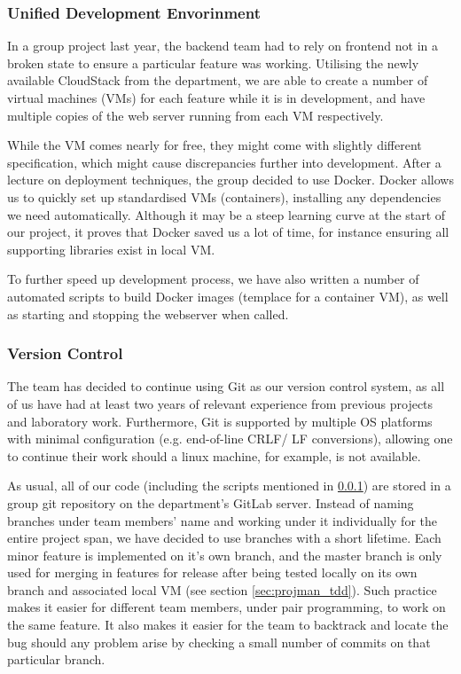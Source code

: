 \documentclass[a4paper, titlepage]{article}
\begin{document}
\subsubsection{Unified Development Envorinment} \label{sec:projman_devenv}


In a group project last year, the backend team had to rely on frontend not in a broken state to ensure a 
particular feature was working. Utilising the newly available CloudStack from the department,
we are able to create a number of virtual machines (VMs) for each feature while it is in development,
and have multiple copies of the web server running from each VM respectively.

While the VM comes nearly for free, they might come with slightly different specification,
which might cause discrepancies further into development. After a lecture on deployment techniques, the group decided to use Docker. Docker allows us to quickly set up standardised VMs (containers), installing any dependencies we need automatically. Although it may be a steep learning curve at the start of our project, it proves that Docker saved us a lot of time, 
for instance ensuring all supporting libraries exist in local VM.

To further speed up development process, we have also written a number of automated scripts
to build Docker images (templace for a container VM), as well as starting and stopping the
webserver when called.

\subsubsection{Version Control}
The team has decided to continue using Git as our version control system, as all of us have had
at least two years of relevant experience from previous projects and laboratory work. Furthermore,
Git is supported by multiple OS platforms with minimal configuration (e.g. end-of-line CRLF/ LF conversions),
allowing one to continue their work should a linux machine, for example, is not available.

As usual, all of our code (including the scripts mentioned in \ref{sec:projman_devenv}) 
are stored in a group git repository on the department's GitLab server. Instead of naming branches under team members'
name and working under it individually for the entire project span, we have decided to use branches with a short lifetime.
Each minor feature is implemented on it's own branch, and the master branch is only used for merging in features for release
after being tested locally on its own branch and associated local VM (see section \ref{sec:projman_tdd}).
Such practice makes it easier for different team members, under pair programming, to work on the same feature.
It also makes it easier for the team to backtrack and locate the bug should any problem arise by checking a small number of commits on that particular branch.
\end{document}
